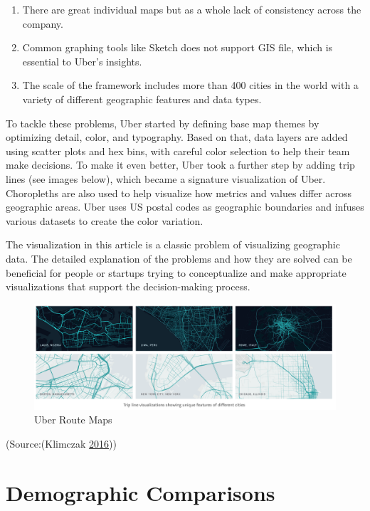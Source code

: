 \documentclass[]{book}
\providecommand{\tightlist}{%
  \setlength{\itemsep}{0pt}\setlength{\parskip}{0pt}}
\begin{document}
\begin{enumerate}
\def\labelenumi{\arabic{enumi}.}
\tightlist
\item
  There are great individual maps but as a whole lack of consistency
  across the company.
\item
  Common graphing tools like Sketch does not support GIS file, which is
  essential to Uber's insights.
\item
  The scale of the framework includes more than 400 cities in the world
  with a variety of different geographic features and data types.
\end{enumerate}

To tackle these problems, Uber started by defining base map themes by
optimizing detail, color, and typography. Based on that, data layers are
added using scatter plots and hex bins, with careful color selection to
help their team make decisions. To make it even better, Uber took a
further step by adding trip lines (see images below), which became a
signature visualization of Uber. Choropleths are also used to help
visualize how metrics and values differ across geographic areas. Uber
uses US postal codes as geographic boundaries and infuses various
datasets to create the color variation.

The visualization in this article is a classic problem of visualizing
geographic data. The detailed explanation of the problems and how they
are solved can be beneficial for people or startups trying to
conceptualize and make appropriate visualizations that support the
decision-making process.

\begin{figure}
\centering
\includegraphics{images/uber_mapping.png}
\caption{Uber Route Maps}
\end{figure}

(Source:(Klimczak \protect\hyperlink{ref-uber_maps}{2016}))

\section{Demographic Comparisons}\label{demographic-comparisons}
\end{document}
